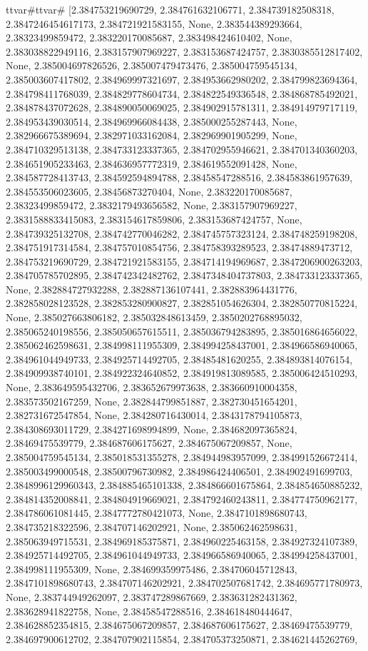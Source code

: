 \documentclass[
  11pt,
  french,
]{article}
\begin{document}
\begin{tcolorbox}[title= Répartition des volumes selon leurs caractéristiques ,colback=boitecode]
ttvar{#}ttvar{#} [2.384753219690729, 2.384761632106771, 2.384739182508318, 2.3847246454617173, 2.384721921583155, None, 2.383544389293664, 2.38323499859472, 2.383220170085687, 2.383498424610402, None, 2.383038822949116, 2.383157907969227, 2.383153687424757, 2.3830385512817402, None, 2.385004697826526, 2.385007479473476, 2.385004759545134, 2.385003607417802, 2.384969997321697, 2.384953662980202, 2.384799823694364, 2.384798411768039, 2.384829778604734, 2.384822549336548, 2.384868785492021, 2.384878437072628, 2.384890050069025, 2.384902915781311, 2.384914979717119, 2.384953439030514, 2.384969966084438, 2.385000255287443, None, 2.382966675389694, 2.382971033162084, 2.382969901905299, None, 2.384710329513138, 2.384733123337365, 2.384702955946621, 2.384701340360203, 2.384651905233463, 2.384636957772319, 2.384619552091428, None, 2.384587728413743, 2.384592594894788, 2.38458547288516, 2.384583861957639, 2.384553506023605, 2.38456873270404, None, 2.383220170085687, 2.38323499859472, 2.3832179493656582, None, 2.383157907969227, 2.3831588833415083, 2.383154617859806, 2.383153687424757, None, 2.384739325132708, 2.384742770046282, 2.384745757323124, 2.384748259198208, 2.384751917314584, 2.384757010854756, 2.384758393289523, 2.38474889473712, 2.384753219690729, 2.384721921583155, 2.384714194969687, 2.3847206900263203, 2.384705785702895, 2.384742342482762, 2.3847348404737803, 2.384733123337365, None, 2.382884727932288, 2.382887136107441, 2.382883964431776, 2.382858028123528, 2.382853280900827, 2.382851054626304, 2.382850770815224, None, 2.385027663806182, 2.385032848613459, 2.3850202768895032, 2.385065240198556, 2.385050657615511, 2.385036794283895, 2.385016864656022, 2.385062462598631, 2.384998111955309, 2.384994258437001, 2.384966586940065, 2.384961044949733, 2.384925714492705, 2.38485481620255, 2.384893814076154, 2.384909938740101, 2.384922324640852, 2.384919813089585, 2.385006424510293, None, 2.383649595432706, 2.383652679973638, 2.383660910004358, 2.383573502167259, None, 2.382844799851887, 2.382730451654201, 2.382731672547854, None, 2.384280716430014, 2.3843178794105873, 2.384308693011729, 2.384271698994899, None, 2.384682097365824, 2.38469475539779, 2.384687606175627, 2.384675067209857, None, 2.385004759545134, 2.385018531355278, 2.384944983957099, 2.384991526672414, 2.385003499000548, 2.38500796730982, 2.384986424406501, 2.384902491699703, 2.3848996129960343, 2.384885465101338, 2.384866601675864, 2.384854650885232, 2.384814352008841, 2.384804919669021, 2.384792460243811, 2.384774750962177, 2.384786061081445, 2.3847772780421073, None, 2.3847101898680743, 2.384735218322596, 2.384707146202921, None, 2.385062462598631, 2.385063949715531, 2.384969185375871, 2.384960225463158, 2.384927324107389, 2.384925714492705, 2.384961044949733, 2.384966586940065, 2.384994258437001, 2.384998111955309, None, 2.384699359975486, 2.384706045712843, 2.3847101898680743, 2.384707146202921, 2.384702507681742, 2.384695771780973, None, 2.383744949262097, 2.383747289867669, 2.383631282431362, 2.383628941822758, None, 2.38458547288516, 2.384618480444647, 2.384628852354815, 2.384675067209857, 2.384687606175627, 2.38469475539779, 2.384697900612702, 2.384707902115854, 2.384705373250871, 2.384621445262769, 
\end{tcolorbox}
\end{document}
